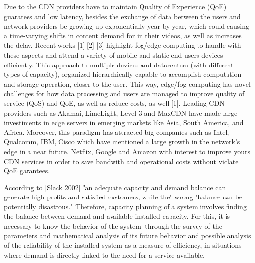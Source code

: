 Due to the CDN providers have to maintain Quality of Experience (QoE) guaratees and low latency, besides the exchange of data between the users and network providers be growing up exponentially year-by-year, which could causing a time-varying shifts in content demand for in their videos, as well as increases the delay. Recent works [1] [2] [3] highlight fog/edge computing to handle with these aspects and attend a variety of mobile and static end-users devices efficiently. 
This approach to multiple devices and datacenters (with different types of capacity), organized hierarchically capable to accomplish computation and storage operation,  closer to the user. This way, edge/fog computing has novel challenges for how data processing and users are managed to improve quality of service (QoS) and QoE, as well as reduce costs, as well [1]. 
Leading CDN providers such as Akamai, LimeLight, Level 3 and MaxCDN have made large investiments in edge servers in emerging markets like Asia, South America, and Africa.
Moreover, this paradigm has attracted big companies such as Intel, Qualcomm, IBM, Cisco which have mentioned a large growth in the network's edge in a near future.
Netflix, Google and Amazon with interest to improve yours CDN services in order to save bandwith and operational costs without violate QoE garantees. %

According to [Slack 2002] "an adequate capacity and demand balance can generate high profits and satisfied customers, while the" wrong "balance can be potentially disastrous." Therefore, capacity planning of a system involves finding the balance between demand and available installed capacity. For this, it is necessary to know the behavior of the system, through the survey of the parameters and mathematical analysis of its future behavior and possible analysis of the reliability of the installed system as a measure of efficiency, in situations where demand is directly linked to the need for a service available.



